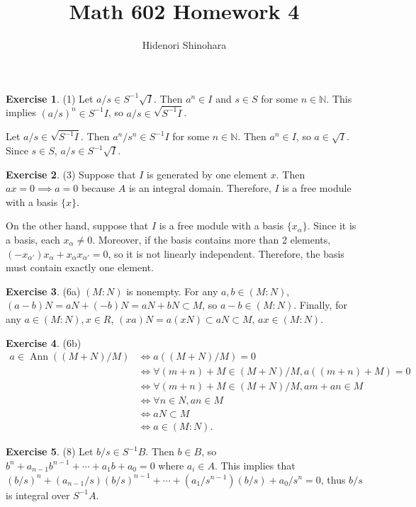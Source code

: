 \documentclass[12pt, psamsfonts]{amsart}
\theoremstyle{definition}
\newtheorem*{exer}{Exercise}
\theoremstyle{remark}
\DeclareMathOperator{\Ann}{Ann}
\numberwithin{equation}{section}
\begin{document}
\title{Math 602 Homework 4}
\author{Hidenori Shinohara}
\maketitle

\begin{exer}{(1)}
  Let $a / s \in S^{-1}\sqrt{I}$.
  Then $a^n \in I$ and $s \in S$ for some $n \in \mathbb{N}$.
  This implies $(a / s)^n \in S^{-1}I$, so $a / s \in \sqrt{S^{-1}I}$.

  Let $a / s \in \sqrt{S^{-1}I}$.
  Then $a^n / s^n \in S^{-1}I$ for some $n \in \mathbb{N}$.
  Then $a^n \in I$, so $a \in \sqrt{I}$.
  Since $s \in S$, $a / s \in S^{-1}\sqrt{I}$.
\end{exer}

\begin{exer}{(3)}
  Suppose that $I$ is generated by one element $x$.
  Then $ax = 0 \implies a = 0$ because $A$ is an integral domain.
  Therefore, $I$ is a free module with a basis $\{ x \}$.
  
  On the other hand, suppose that $I$ is a free module with a basis $\{ x_{\alpha} \}$.
  Since it is a basis, each $x_{\alpha} \ne 0$.
  Moreover, if the basis contains more than 2 elements, $(-x_{\alpha'})x_{\alpha} + x_{\alpha}x_{\alpha'} = 0$, so it is not linearly independent.
  Therefore, the basis must contain exactly one element.
\end{exer}

\begin{exer}{(6a)}
  $(M:N)$ is nonempty.
  For any $a, b \in (M:N)$, $(a - b)N = aN + (-b)N = aN + bN \subset M$, so $a - b \in (M:N)$.
  Finally, for any $a \in (M:N), x \in R$, $(xa)N = a(xN) \subset aN \subset M$, $ax \in (M:N)$.
\end{exer}

\begin{exer}{(6b)}
  $ $
  \begin{align*}
    a \in \Ann((M + N) / M)
      &\iff a((M + N) / M) = 0 \\
      &\iff \forall (m + n) + M \in (M + N) / M, a((m + n) + M) = 0 \\
      &\iff \forall (m + n) + M \in (M + N) / M, am + an \in M \\
      &\iff \forall n \in N, an \in M \\
      &\iff aN \subset M \\
      &\iff a \in (M:N).
  \end{align*}
\end{exer}

\begin{exer}{(8)}
  Let $b / s \in S^{-1}B$.
  Then $b \in B$, so $b^n + a_{n - 1}b^{n - 1} + \cdots + a_1b + a_0 = 0$ where $a_i \in A$.
  This implies that $(b / s)^n + (a_{n - 1} / s)(b / s)^{n - 1} + \cdots + (a_1 / s^{n - 1})(b / s) + a_0 / s^n = 0$, thus $b / s$ is integral over $S^{-1}A$.
\end{exer}
\end{document}
